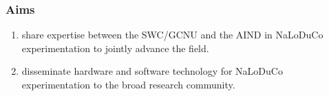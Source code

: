 
\begin{frame}
    \frametitle{Aims}

\begin{enumerate}

    \item share expertise between the SWC/GCNU and the AIND in NaLoDuCo
        experimentation to jointly advance the field.

    \item disseminate hardware and software technology for NaLoDuCo
        experimentation to the broad research community.

\end{enumerate}

\end{frame}

